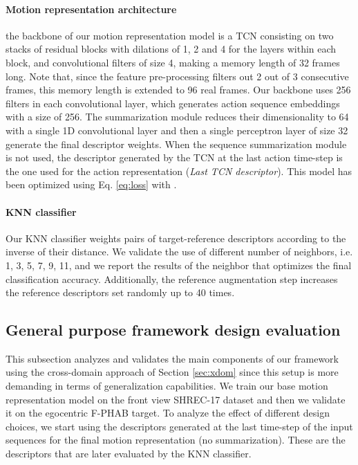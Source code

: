 \documentclass[letterpaper, 10 pt, conference]{ieeeconf}
\begin{document}
\paragraph*{Motion representation architecture}
the backbone of our motion representation model is a TCN consisting on two stacks of residual blocks with dilations of 1, 2 and 4 for the layers within each block,
and convolutional filters of size 4, making a memory length of 32 frames long. Note that, since the feature pre-processing filters out 2 out of 3 consecutive frames, this memory length is extended to 96 real frames.
Our backbone uses 256 filters in each convolutional layer, which generates action sequence embeddings with a size of 256. The summarization module reduces their dimensionality to 64 with a single 1D convolutional layer and then a single perceptron layer of size 32 generate the final descriptor weights. 
When the sequence summarization module is not used, the descriptor generated by the TCN at the last action time-step is the one used for the action representation (\textit{Last TCN descriptor}). 
This model has been optimized using Eq. \ref{eq:loss} with .

\paragraph*{KNN classifier}
Our KNN classifier weights pairs of target-reference descriptors according to the inverse of their distance.
We validate the use of different number of neighbors,  i.e. 1, 3, 5, 7, 9, 11, and we report the results of the neighbor that optimizes the final classification accuracy. Additionally, the reference augmentation step increases the reference descriptors set randomly up to 40 times.


















\subsection{General purpose framework design evaluation}

This subsection analyzes and validates the main components of our framework using the cross-domain approach of Section \ref{sec:xdom} since this setup is more demanding in terms of generalization capabilities.
We train our base motion representation model on the front view SHREC-17 dataset and then we validate it on the egocentric F-PHAB target. 
To analyze the effect of different design choices, we start using the descriptors generated at the last time-step of the input sequences for the final motion representation (no summarization). These are the descriptors that are later evaluated by the KNN classifier.
\end{document}
